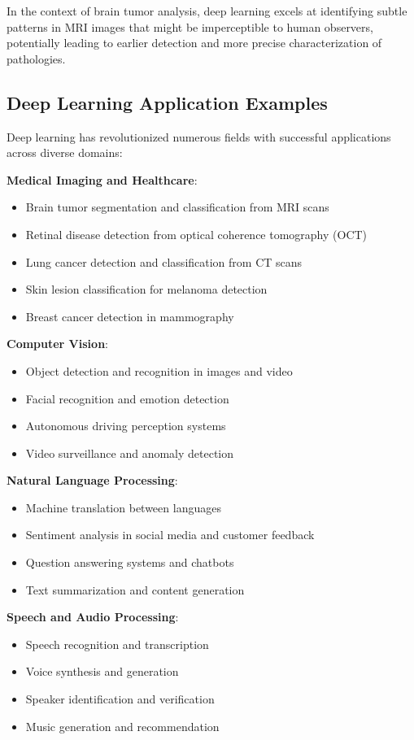 In the context of brain tumor analysis, deep learning excels at identifying subtle patterns in MRI images that might be imperceptible to human observers, potentially leading to earlier detection and more precise characterization of pathologies.

\subsection{Deep Learning Application Examples}
\label{sec:dl_applications}
Deep learning has revolutionized numerous fields with successful applications across diverse domains:

\textbf{Medical Imaging and Healthcare}:
\begin{itemize}
  \item Brain tumor segmentation and classification from MRI scans \cite{havaei2017brain}
  \item Retinal disease detection from optical coherence tomography (OCT) \cite{de2018clinically}
  \item Lung cancer detection and classification from CT scans \cite{ardila2019end}
  \item Skin lesion classification for melanoma detection \cite{esteva2017dermatologist}
  \item Breast cancer detection in mammography \cite{mckinney2020international}
\end{itemize}

\textbf{Computer Vision}:
\begin{itemize}
  \item Object detection and recognition in images and video
  \item Facial recognition and emotion detection
  \item Autonomous driving perception systems
  \item Video surveillance and anomaly detection
\end{itemize}

\textbf{Natural Language Processing}:
\begin{itemize}
  \item Machine translation between languages
  \item Sentiment analysis in social media and customer feedback
  \item Question answering systems and chatbots
  \item Text summarization and content generation
\end{itemize}

\textbf{Speech and Audio Processing}:
\begin{itemize}
  \item Speech recognition and transcription
  \item Voice synthesis and generation
  \item Speaker identification and verification
  \item Music generation and recommendation
\end{itemize}

